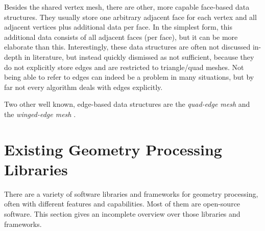 Besides the shared vertex mesh, there are other, more capable face-based data structures.
They usually store one arbitrary adjacent face for each vertex and all adjacent vertices plus additional data per face.
In the simplest form, this additional data consists of all adjacent faces (per face), but it can be more elaborate than this.
Interestingly, these data structures are often not discussed in-depth in literature, but instead quickly dismissed as not sufficient, because they do not explicitly store edges and are restricted to triangle/quad meshes.
Not being able to refer to edges can indeed be a problem in many situations, but by far not every algorithm deals with edges explicitly.

Two other well known, edge-based data structures are the \emph{quad-edge mesh} \cite{guibas1985primitives} and the \emph{winged-edge mesh} \cite{baumgart1972winged}.



\section{Existing Geometry Processing Libraries}

There are a variety of software libraries and frameworks for geometry processing, often with different features and capabilities.
Most of them are open-source software.
This section gives an incomplete overview over those libraries and frameworks.

